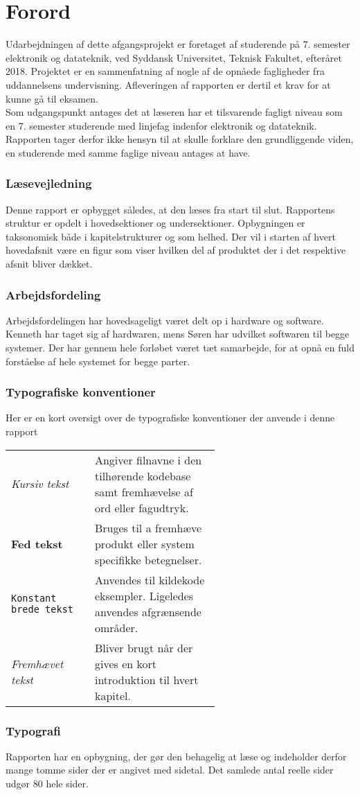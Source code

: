 \chapter*{Forord}\label{chap:forord}

Udarbejdningen af dette afgangsprojekt er foretaget af studerende på 7. semester elektronik og datateknik, ved Syddansk Universitet, Teknisk Fakultet, efteråret 2018. Projektet er en sammenfatning af nogle af de opnåede fagligheder fra uddannelsens undervisning. Afleveringen af rapporten er dertil et krav for at kunne gå til eksamen.\\

Som udgangspunkt antages det at læseren har et tilsvarende fagligt niveau som en 7. semester studerende med linjefag indenfor elektronik og datateknik.
Rapporten tager derfor ikke hensyn til at skulle forklare den grundliggende viden, en studerende med samme faglige niveau antages at have.

\subsection{Læsevejledning}
Denne rapport er opbygget således, at den læses fra start til slut. Rapportens struktur er opdelt i hovedsektioner og undersektioner. Opbygningen er taksonomisk både i kapitelstrukturer og som helhed. Der vil i starten af hvert hovedafsnit være en figur som viser hvilken del af produktet der i det respektive afsnit bliver dækket.

\subsection{Arbejdsfordeling}
Arbejdsfordelingen har hovedsageligt været delt op i hardware og software. Kenneth har taget sig af hardwaren, mens Søren har udvilket softwaren til begge systemer. Der har gennem hele forløbet været tæt samarbejde, for at opnå en fuld forståelse af hele systemet for begge parter. 

\subsection{Typografiske konventioner}
Her er en kort oversigt over de typografiske konventioner der anvende i denne rapport\\
\begin{tabular}{l p{0.6\linewidth}}
	\textit{Kursiv tekst}			& Angiver filnavne i den tilhørende kodebase samt fremhævelse af ord eller fagudtryk. \\
	\textbf{Fed tekst}				& Bruges til a fremhæve produkt eller system specifikke betegnelser.\\
	\texttt{Konstant brede tekst}	& Anvendes til kildekode eksempler. Ligeledes anvendes afgrænsende områder.\\
	\emph{Fremhævet tekst}		    & Bliver brugt når der gives en kort introduktion til hvert kapitel.\\
\end{tabular}

\subsection{Typografi}
Rapporten har en opbygning, der gør den behagelig at læse og indeholder derfor mange tomme sider der er angivet med sidetal.
Det samlede antal reelle sider udgør 80 hele sider. 